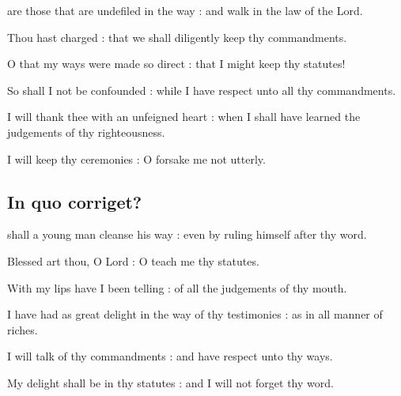 are those that are undefiled in the way : and walk in the law of the Lord.\par
{}
Thou hast charged : that we shall diligently keep thy commandments.\par
{}O that my ways were made so direct : that I might keep thy statutes!\par
{}So shall I not be confounded : while I have respect unto all thy commandments.\par
{}I will thank thee with an unfeigned heart : when I shall have learned the judgements of thy righteousness.\par
{}I will keep thy ceremonies : O forsake me not utterly.\par

\clearpage
\subsection{In quo corriget?}
 shall a young man cleanse his way : even by ruling himself after thy word.\par
{}
Blessed art thou, O Lord : O teach me thy statutes.\par
{}With my lips have I been telling : of all the judgements of thy mouth.\par
{}I have had as great delight in the way of thy testimonies : as in all manner of riches.\par
{}I will talk of thy commandments : and have respect unto thy ways.\par
{}My delight shall be in thy statutes : and I will not forget thy word.\par

